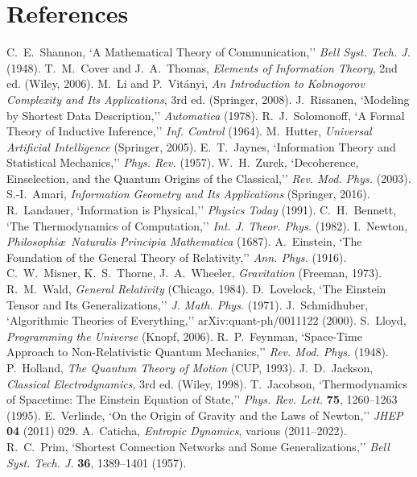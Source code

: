 \documentclass[aps,preprint,onecolumn,longbibliography,nofootinbib]{revtex4-2}
\numberwithin{equation}{section}
\begin{document}
\section*{References}
\begin{thebibliography}{99}
 C.~E.~Shannon, `A Mathematical Theory of Communication,'' \emph{Bell Syst. Tech. J.} (1948).
 T.~M.~Cover and J.~A.~Thomas, \emph{Elements of Information Theory}, 2nd ed. (Wiley, 2006).
 M.~Li and P.~Vit\'anyi, \emph{An Introduction to Kolmogorov Complexity and Its Applications}, 3rd ed. (Springer, 2008).
 J.~Rissanen, `Modeling by Shortest Data Description,'' \emph{Automatica} (1978).
 R.~J.~Solomonoff, `A Formal Theory of Inductive Inference,'' \emph{Inf. Control} (1964).
 M.~Hutter, \emph{Universal Artificial Intelligence} (Springer, 2005).
 E.~T.~Jaynes, `Information Theory and Statistical Mechanics,'' \emph{Phys. Rev.} (1957).
 W.~H.~Zurek, `Decoherence, Einselection, and the Quantum Origins of the Classical,'' \emph{Rev. Mod. Phys.} (2003).
 S.-I.~Amari, \emph{Information Geometry and Its Applications} (Springer, 2016).
 R.~Landauer, `Information is Physical,'' \emph{Physics Today} (1991).
 C.~H.~Bennett, `The Thermodynamics of Computation,'' \emph{Int. J. Theor. Phys.} (1982).
 I.~Newton, \emph{Philosophi\ae\ Naturalis Principia Mathematica} (1687).
 A.~Einstein, `The Foundation of the General Theory of Relativity,'' \emph{Ann. Phys.} (1916).
 C.~W.~Misner, K.~S.~Thorne, J.~A.~Wheeler, \emph{Gravitation} (Freeman, 1973).
 R.~M.~Wald, \emph{General Relativity} (Chicago, 1984).
 D.~Lovelock, `The Einstein Tensor and Its Generalizations,'' \emph{J. Math. Phys.} (1971).
 J.~Schmidhuber, `Algorithmic Theories of Everything,'' arXiv:quant-ph/0011122 (2000).
 S.~Lloyd, \emph{Programming the Universe} (Knopf, 2006).
 R.~P.~Feynman, `Space-Time Approach to Non-Relativistic Quantum Mechanics,'' \emph{Rev. Mod. Phys.} (1948).
 P.~Holland, \emph{The Quantum Theory of Motion} (CUP, 1993).
 J.~D.~Jackson, \emph{Classical Electrodynamics}, 3rd ed. (Wiley, 1998).
 T.~Jacobson, `Thermodynamics of Spacetime: The Einstein Equation of State,'' \emph{Phys. Rev. Lett.} \textbf{75}, 1260--1263 (1995).
 E.~Verlinde, `On the Origin of Gravity and the Laws of Newton,'' \emph{JHEP} \textbf{04} (2011) 029.
 A.~Caticha, \emph{Entropic Dynamics}, various (2011--2022).
 R.~C.~Prim, `Shortest Connection Networks and Some Generalizations,'' \emph{Bell Syst. Tech. J.} \textbf{36}, 1389--1401 (1957).
\end{thebibliography}
\end{document}
